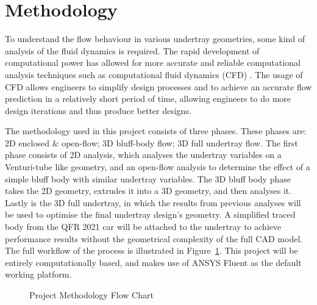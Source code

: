 \section{Methodology}
To understand the flow behaviour in various undertray geometries, some kind of analysis of the fluid dynamics is required. The rapid development of computational power has allowed for more accurate and reliable computational analysis techniques such as computational fluid dynamics (CFD) \cite{Andersson2011ComputationalEngineers}. The usage of CFD allows engineers to simplify design processes and to achieve an accurate flow prediction in a relatively short period of time, allowing engineers to do more design iterations and thus produce better designs.

\noindent The methodology used in this project consists of three phases. These phases are: 2D enclosed \& open-flow; 3D bluff-body flow; 3D full undertray flow. The first phase consists of 2D analysis, which analyses the undertray variables on a Venturi-tube like geometry, and an open-flow analysis to determine the effect of a simple bluff body with similar undertray variables. The 3D bluff body phase takes the 2D geometry, extrudes it into a 3D geometry, and then analyses it. Lastly is the 3D full undertray, in which the results from previous analyses will be used to optimise the final undertray design's geometry. A simplified traced body from the QFR 2021 car will be attached to the undertray to achieve performance results without the geometrical complexity of the full CAD model. The full workflow of the process is illustrated in Figure~\ref{fig:project methodology}. This project will be entirely computationally based, and makes use of ANSYS Fluent as the default working platform.

\begin{figure}[!h]
    \centering
    \caption{Project Methodology Flow Chart}
    \label{fig:project methodology}
\end{figure}

